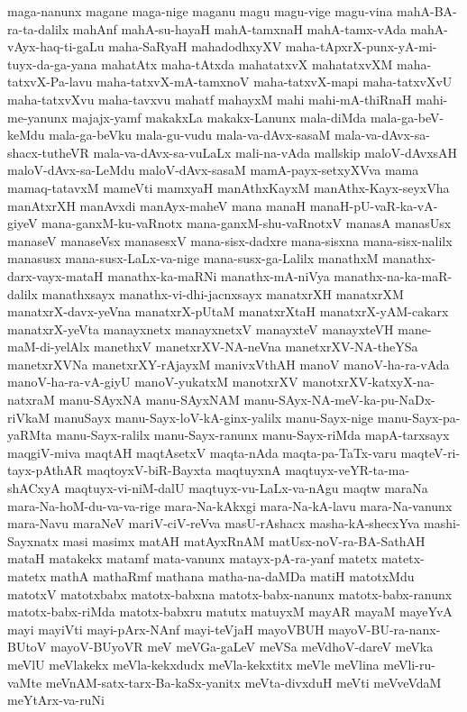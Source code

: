 {maga-nanunx
magane
maga-nige
maganu
magu
magu-vige
magu-vina
mahA-BA-ra-ta-dalilx
mahAnf
mahA-su-hayaH
mahA-tamxnaH
mahA-tamx-vAda
mahA-vAyx-haq-ti-gaLu
maha-SaRyaH
mahadodhxyXV
maha-tApxrX-punx-yA-mi-tuyx-da-ga-yana
mahatAtx
maha-tAtxda
mahatatxvX
mahatatxvXM
maha-tatxvX-Pa-lavu
maha-tatxvX-mA-tamxnoV
maha-tatxvX-mapi
maha-tatxvXvU
maha-tatxvXvu
maha-tavxvu
mahatf
mahayxM
mahi
mahi-mA-thiRnaH
mahi-me-yanunx
majajx-yamf
makakxLa
makakx-Lanunx
mala-diMda
mala-ga-beV-keMdu
mala-ga-beVku
mala-gu-vudu
mala-va-dAvx-sasaM
mala-va-dAvx-sa-shacx-tutheVR
mala-va-dAvx-sa-vuLaLx
mali-na-vAda
mallskip
maloV-dAvxsAH
maloV-dAvx-sa-LeMdu
maloV-dAvx-sasaM
mamA-payx-setxyXVva
mama
mamaq-tatavxM
mameVti
mamxyaH
manAthxKayxM
manAthx-Kayx-seyxVha
manAtxrXH
manAvxdi
manAyx-maheV
mana
manaH
manaH-pU-vaR-ka-vA-giyeV
mana-ganxM-ku-vaRnotx
mana-ganxM-shu-vaRnotxV
manasA
manasUsx
manaseV
manaseVsx
manasesxV
mana-sisx-dadxre
mana-sisxna
mana-sisx-nalilx
manasusx
mana-susx-LaLx-va-nige
mana-susx-ga-Lalilx
manathxM
manathx-darx-vayx-mataH
manathx-ka-maRNi
manathx-mA-niVya
manathx-na-ka-maR-dalilx
manathxsayx
manathx-vi-dhi-jacnxsayx
manatxrXH
manatxrXM
manatxrX-davx-yeVna
manatxrX-pUtaM
manatxrXtaH
manatxrX-yAM-cakarx
manatxrX-yeVta
manayxnetx
manayxnetxV
manayxteV
manayxteVH
mane-maM-di-yelAlx
manethxV
manetxrXV-NA-neVna
manetxrXV-NA-theYSa
manetxrXVNa
manetxrXY-rAjayxM
manivxVthAH
manoV
manoV-ha-ra-vAda
manoV-ha-ra-vA-giyU
manoV-yukatxM
manotxrXV
manotxrXV-katxyX-na-natxraM
manu-SAyxNA
manu-SAyxNAM
manu-SAyx-NA-meV-ka-pu-NaDx-riVkaM
manuSayx
manu-Sayx-loV-kA-ginx-yalilx
manu-Sayx-nige
manu-Sayx-pa-yaRMta
manu-Sayx-ralilx
manu-Sayx-ranunx
manu-Sayx-riMda
mapA-tarxsayx
maqgiV-miva
maqtAH
maqtAsetxV
maqta-nAda
maqta-pa-TaTx-varu
maqteV-ri-tayx-pAthAR
maqtoyxV-biR-Bayxta
maqtuyxnA
maqtuyx-veYR-ta-ma-shACxyA
maqtuyx-vi-niM-dalU
maqtuyx-vu-LaLx-va-nAgu
maqtw
maraNa
mara-Na-hoM-du-va-va-rige
mara-Na-kAkxgi
mara-Na-kA-lavu
mara-Na-vanunx
mara-Navu
maraNeV
mariV-ciV-reVva
masU-rAshacx
masha-kA-shecxYva
mashi-Sayxnatx
masi
masimx
matAH
matAyxRnAM
matUsx-noV-ra-BA-SathAH
mataH
matakekx
matamf
mata-vanunx
matayx-pA-ra-yanf
matetx
matetx-matetx
mathA
mathaRmf
mathana
matha-na-daMDa
matiH
matotxMdu
matotxV
matotxbabx
matotx-babxna
matotx-babx-nanunx
matotx-babx-ranunx
matotx-babx-riMda
matotx-babxru
matutx
matuyxM
mayAR
mayaM
mayeYvA
mayi
mayiVti
mayi-pArx-NAnf
mayi-teVjaH
mayoVBUH
mayoV-BU-ra-nanx-BUtoV
mayoV-BUyoVR
meV
meVGa-gaLeV
meVSa
meVdhoV-dareV
meVka
meVlU
meVlakekx
meVla-kekxdudx
meVla-kekxtitx
meVle
meVlina
meVli-ru-vaMte
meVnAM-satx-tarx-Ba-kaSx-yanitx
meVta-divxduH
meVti
meVveVdaM
meYtArx-va-ruNi
}
